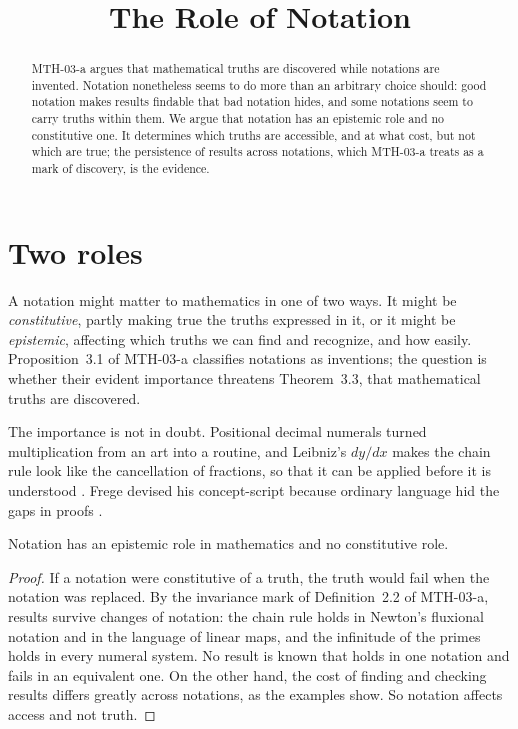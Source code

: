 \documentclass{situationist-preprint}
\title{The Role of Notation}
\begin{document}
\maketitle

\begin{abstract}
MTH-03-a argues that mathematical truths are discovered while notations are invented. Notation nonetheless seems to do more than an arbitrary choice should: good notation makes results findable that bad notation hides, and some notations seem to carry truths within them. We argue that notation has an epistemic role and no constitutive one. It determines which truths are accessible, and at what cost, but not which are true; the persistence of results across notations, which MTH-03-a treats as a mark of discovery, is the evidence.
\end{abstract}

\section{Two roles}\label{s:roles}

A notation might matter to mathematics in one of two ways. It might be \emph{constitutive}, partly making true the truths expressed in it, or it might be \emph{epistemic}, affecting which truths we can find and recognize, and how easily. Proposition~3.1 of MTH-03-a classifies notations as inventions; the question is whether their evident importance threatens Theorem~3.3, that mathematical truths are discovered.

The importance is not in doubt. Positional decimal numerals turned multiplication from an art into a routine, and Leibniz's $dy/dx$ makes the chain rule look like the cancellation of fractions, so that it can be applied before it is understood \citep{Cajori1928}. Frege devised his concept-script because ordinary language hid the gaps in proofs \citep{Frege1879}.

\begin{proposition}\label{p:epi}
Notation has an epistemic role in mathematics and no constitutive role.
\end{proposition}

\begin{proof}
If a notation were constitutive of a truth, the truth would fail when the notation was replaced. By the invariance mark of Definition~2.2 of MTH-03-a, results survive changes of notation: the chain rule holds in Newton's fluxional notation and in the language of linear maps, and the infinitude of the primes holds in every numeral system. No result is known that holds in one notation and fails in an equivalent one. On the other hand, the cost of finding and checking results differs greatly across notations, as the examples show. So notation affects access and not truth.
\end{proof}
\end{document}
